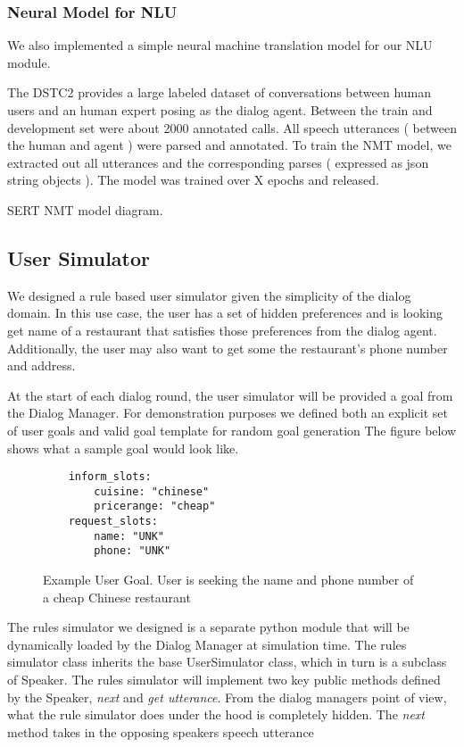 \subsubsection{Neural Model for NLU}

We also implemented a simple neural machine translation model for our NLU module. 

The DSTC2 provides a large labeled dataset of conversations between human users and an human expert posing as the dialog agent. Between the train and development set were about 2000 annotated calls. All speech utterances ( between the human and agent ) were parsed and annotated. To train the NMT model, we extracted out all utterances and the corresponding parses ( expressed as json string objects ). The model was trained over X epochs and released.

SERT NMT model diagram.


\subsection{User Simulator}

We designed a rule based user simulator given the simplicity of the dialog domain. In this use case, the user has a set of hidden preferences and is looking get name of a restaurant that satisfies those preferences from the dialog agent. Additionally, the user may also want to get some the restaurant's phone number and address.

At the start of each dialog round, the user simulator will be provided a goal from the Dialog Manager. For demonstration purposes we defined both an explicit set of user goals  and valid goal template for random goal generation The figure below shows what a sample goal would look like. 

\begin{figure}[h!]
	\caption{ Example User Goal. User is seeking the name and phone number of a cheap Chinese restaurant}
	\label{fig:ex_user_goal}
	\begin{lstlisting}
	inform_slots:
		cuisine: "chinese"
		pricerange: "cheap"
	request_slots:
		name: "UNK"
		phone: "UNK"	
	\end{lstlisting}
\end{figure}

The rules simulator we designed is a separate python module that will be dynamically loaded by the Dialog Manager at simulation time. The rules simulator class inherits the base UserSimulator class, which in turn is a subclass of Speaker. The rules simulator will implement two key public methods defined by the Speaker, \textit{next} and \textit{get utterance}. From the dialog managers point of view, what the rule simulator does under the hood is completely hidden. The \textit{next} method takes in the opposing speakers speech utterance 

